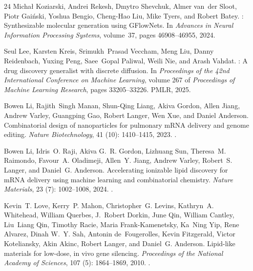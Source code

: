 \documentclass{article}
\begin{document}
\begin{thebibliography}{24}
Micha{\l} Koziarski, Andrei Rekesh, Dmytro Shevchuk, Almer van~der Sloot, Piotr
  Gai\'{n}ski, Yoshua Bengio, Cheng-Hao Liu, Mike Tyers, and Robert Batey.
: Synthesizable molecular generation using {GFlowNets}.
\newblock In \emph{Advances in Neural Information Processing Systems},
  volume~37, pages 46908--46955, 2024.

Seul Lee, Karsten Kreis, Srimukh~Prasad Veccham, Meng Liu, Danny Reidenbach,
  Yuxing Peng, Saee~Gopal Paliwal, Weili Nie, and Arash Vahdat.
: A drug discovery generalist with discrete diffusion.
\newblock In \emph{Proceedings of the 42nd International Conference on Machine
  Learning}, volume 267 of \emph{Proceedings of Machine Learning Research},
  pages 33205--33226. PMLR, 2025.

Bowen Li, Rajith~Singh Manan, Shun-Qing Liang, Akiva Gordon, Allen Jiang,
  Andrew Varley, Guangping Gao, Robert Langer, Wen Xue, and Daniel Anderson.
\newblock Combinatorial design of nanoparticles for pulmonary {mRNA} delivery
  and genome editing.
\newblock \emph{Nature Biotechnology}, 41 (10): 1410--1415,
  2023.
\newblock {}.

Bowen Li, Idris~O. Raji, Akiva G.~R. Gordon, Lizhuang Sun, Theresa~M. Raimondo,
  Favour~A. Oladimeji, Allen~Y. Jiang, Andrew Varley, Robert~S. Langer, and
  Daniel~G. Anderson.
\newblock Accelerating ionizable lipid discovery for {mRNA} delivery using
  machine learning and combinatorial chemistry.
\newblock \emph{Nature Materials}, 23 (7): 1002--1008, 2024.
\newblock {}.

Kevin~T. Love, Kerry~P. Mahon, Christopher~G. Levins, Kathryn~A. Whitehead,
  William Querbes, J.~Robert Dorkin, June Qin, William Cantley, Liu~Liang Qin,
  Timothy Racie, Maria Frank-Kamenetsky, Ka~Ning Yip, Rene Alvarez, Dinah W.~Y.
  Sah, Antonin de~Fougerolles, Kevin Fitzgerald, Victor Koteliansky, Akin
  Akinc, Robert Langer, and Daniel~G. Anderson.
\newblock Lipid-like materials for low-dose, in vivo gene silencing.
\newblock \emph{Proceedings of the National Academy of Sciences}, 107
  (5): 1864--1869, 2010.
\newblock {}.


\end{thebibliography}
\end{document}
